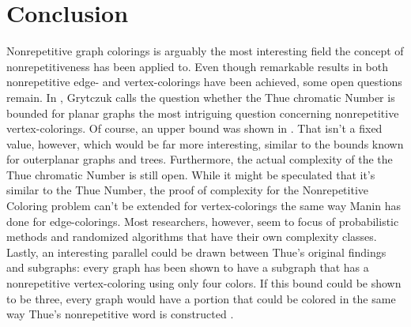 \documentclass[12pt,a4paper]{article}
\begin{document}
\newpage
\section{Conclusion}

Nonrepetitive graph colorings is arguably the most interesting field the concept of nonrepetitiveness has been applied to. Even though remarkable results in both nonrepetitive edge- and vertex-colorings have been achieved, some open questions remain.
\newline
In \citep{Grytczuk2007}, Grytczuk calls the question whether the Thue chromatic Number is bounded for planar graphs the most intriguing question concerning nonrepetitive vertex-colorings. Of course, an upper bound was shown in \citep{Dujmovic2012}. That isn't a fixed value, however, which would be far more interesting, similar to the bounds known for outerplanar graphs and trees.
\newline
Furthermore, the actual complexity of the the Thue chromatic Number is still open. While it might be speculated that it's similar to the Thue Number, the proof of complexity for the Nonrepetitive Coloring problem can't be extended for vertex-colorings the same way Manin has done for edge-colorings. Most researchers, however, seem to focus of probabilistic methods and randomized algorithms that have their own complexity classes.
\newline
Lastly, an interesting parallel could be drawn between Thue's original findings and subgraphs: every graph has been shown to have a subgraph that has a nonrepetitive vertex-coloring using only four colors. If this bound could be shown to be three, every graph would have a portion that could be colored in the same way Thue's nonrepetitive word is constructed \citep{Barat2008}.

\newpage
\printbibliography
\end{document}
